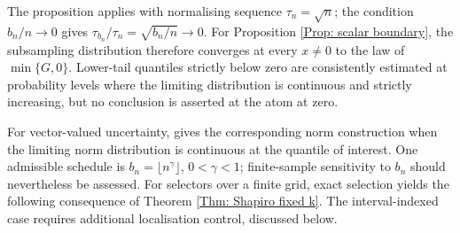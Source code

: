\documentclass[12pt]{article}
\newenvironment{bluechange}{\begingroup\color[rgb]{0.00,0.00,1.00}}{\endgroup}
\theoremstyle{remark}
\theoremstyle{plain}
\begin{document}
\begin{bluechange}
The proposition applies \citet[Theorem 2.2.1 and Corollary 2.4.1]{politis1999subsampling} with normalising sequence $\tau_n=\sqrt n$; the condition $b_n/n\to0$ gives $\tau_{b_n}/\tau_n=\sqrt{b_n/n}\to0$. For Proposition \ref{Prop: scalar boundary}, the subsampling distribution therefore converges at every $x\ne0$ to the law of $\min\{G,0\}$. Lower-tail quantiles strictly below zero are consistently estimated at probability levels where the limiting distribution is continuous and strictly increasing, but no conclusion is asserted at the atom at zero.

For vector-valued uncertainty, \citet[Theorem 2.5.2]{politis1999subsampling} gives the corresponding norm construction when the limiting norm distribution is continuous at the quantile of interest. One admissible schedule is $b_n=\lfloor n^\gamma\rfloor$, $0<\gamma<1$; finite-sample sensitivity to $b_n$ should nevertheless be assessed.
\end{bluechange}
For selectors over a finite grid, exact selection yields the following consequence of Theorem \ref{Thm: Shapiro fixed k}. The interval-indexed case requires additional localisation control, discussed below.
\end{document}
